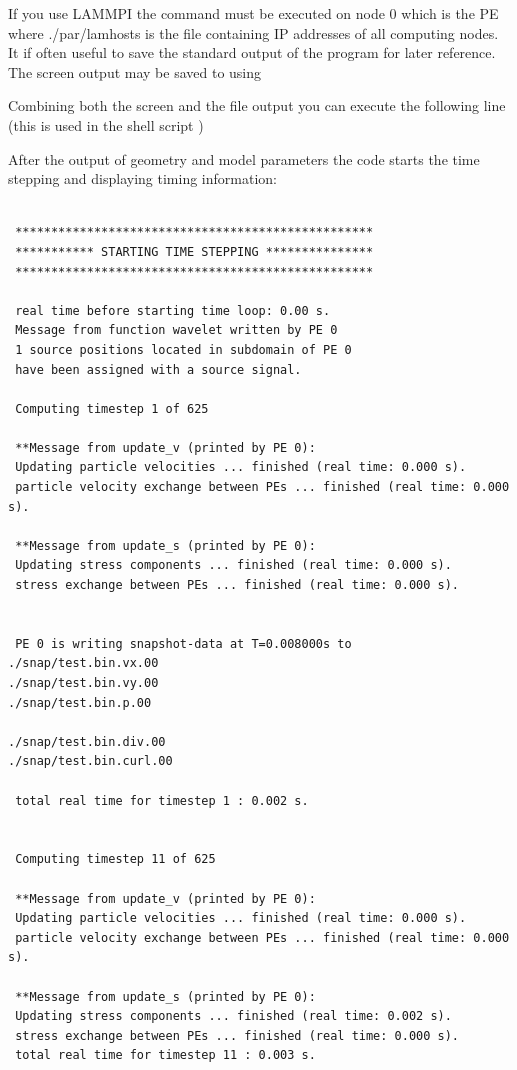 \documentclass[11pt,onecolumn,oneside]{article}
\begin{document}

If you use LAMMPI the command  must be executed on node 0 which is the PE where ./par/lamhosts is the file containing IP addresses of all computing nodes. It if often useful to save the standard output of the program for later reference. The screen output may be saved to  using 


Combining both the screen and the file output you can execute the following line (this is used in the shell script )


After the output of geometry and model parameters the code starts the time stepping and displaying timing information:

\begin{verbatim} 

 **************************************************
 *********** STARTING TIME STEPPING ***************
 **************************************************

 real time before starting time loop: 0.00 s.
 Message from function wavelet written by PE 0
 1 source positions located in subdomain of PE 0
 have been assigned with a source signal.

 Computing timestep 1 of 625

 **Message from update_v (printed by PE 0):
 Updating particle velocities ... finished (real time: 0.000 s).
 particle velocity exchange between PEs ... finished (real time: 0.000 s).

 **Message from update_s (printed by PE 0):
 Updating stress components ... finished (real time: 0.000 s).
 stress exchange between PEs ... finished (real time: 0.000 s).


 PE 0 is writing snapshot-data at T=0.008000s to
./snap/test.bin.vx.00
./snap/test.bin.vy.00
./snap/test.bin.p.00

./snap/test.bin.div.00
./snap/test.bin.curl.00

 total real time for timestep 1 : 0.002 s.


 Computing timestep 11 of 625

 **Message from update_v (printed by PE 0):
 Updating particle velocities ... finished (real time: 0.000 s).
 particle velocity exchange between PEs ... finished (real time: 0.000 s).

 **Message from update_s (printed by PE 0):
 Updating stress components ... finished (real time: 0.002 s).
 stress exchange between PEs ... finished (real time: 0.000 s).
 total real time for timestep 11 : 0.003 s.
\end{verbatim}
\end{document}
